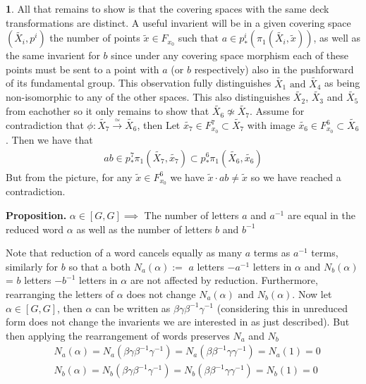 \documentclass[10.5pt]{article}
\theoremstyle{definition}
\newtheorem{pb}{}
\newcommand{\tand}{\text{ and }}
\begin{document}
\begin{pb}
        All that remains to show is that the covering spaces with the same deck transformations are distinct. A useful invarient will be in a given covering space \((\tilde{X_i},p^i)\) the number of points \(\tilde{x} \in F_{x_0}\) such that \(a \in p^i_*(\pi_1(\tilde{X_i},\tilde{x}))\), as well as the same invarient for \(b\) since under any covering space morphism each of these points must be sent to a point with \(a\) (or \(b\) respectively) also in the pushforward of its fundamental group. This observation fully distinguishes \(\tilde{X_1} \tand \tilde{X_4}\) as being non-isomorphic to any of the other spaces. This also distinguishes \(\tilde{X_2}\), \(\tilde{X_3}\) and \(\tilde{X_5}\) from eachother so it only remains to show that \(\tilde{X_6} \not \simeq \tilde{X_7}\). Assume for contradiction that
        \(\phi: \tilde{X_7} \overset{\simeq}{\to} \tilde{X_6}\), then Let \(\tilde{x_7} \in F^7_{x_0} \subset \tilde{X_7}\) with image \(\tilde{x_6} \in F^6_{x_0} \subset \tilde{X_6}\).
        Then we have that
        \begin{align*}
            ab \in p^7_*\pi_1(\tilde{X_7},\tilde{x_7}) \subset p^6_*\pi_1(\tilde{X_6},\tilde{x_6})
        \end{align*}
        But from the picture, for any \(\tilde{x} \in F^6_{x_0}\) we have \(\tilde{x}\cdot ab \neq \tilde{x}\) so we have reached a contradiction.

        \textbf{Proposition.} \(\alpha \in [G,G] \implies\) The number of letters \(a\) and \(a^{-1}\) are equal in the reduced word \(\alpha\) as well as the number of letters \(b\) and \(b^{-1}\)

        Note that reduction of a word cancels equally as many \(a\) terms as \(a^{-1}\) terms, similarly for \(b\) so that a both \(N_a(\alpha) :=\) \(a\) letters \(- a^{-1}\) letters in \(\alpha\) and \(N_b(\alpha)\) = \(b\) letters \(- b^{-1}\) letters in \(\alpha\) are not affected by reduction. Furthermore, rearranging the letters of \(\alpha\) does not change \(N_a(\alpha) \tand N_b(\alpha)\). Now let \(\alpha \in [G,G]\), then \(\alpha\) can be written as \(\beta\gamma\beta^{-1}\gamma^{-1}\) (considering this in unreduced form does not change the invarients we are interested in as just described).
        But then applying the rearrangement of words preserves \(N_a\) and \(N_b\)
        \begin{align*}
            &N_a(\alpha) = N_a(\beta\gamma\beta^{-1}\gamma^{-1}) = N_a(\beta\beta^{-1}\gamma\gamma^{-1}) = N_a(1) = 0 \\
            &N_b(\alpha) = N_b(\beta\gamma\beta^{-1}\gamma^{-1}) = N_b(\beta\beta^{-1}\gamma\gamma^{-1}) = N_b(1) = 0 
        \end{align*}
    \end{pb}
\end{document}
